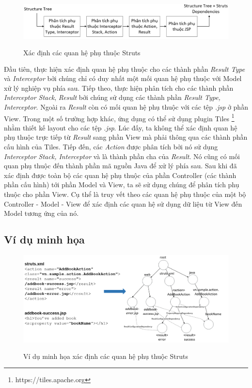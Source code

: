 \documentclass[12pt]{report}
\begin{document}
\begin{figure}[h]
	\centering
	\includegraphics[scale=0.55]{struts-analyzer}
	\label{fig:struts-analyzer}
	\caption{Xác định các quan hệ phụ thuộc Struts}
\end{figure}

Đầu tiên, thực hiện xác định quan hệ phụ thuộc cho các thành phần \textit{Result Type} và \textit{Interceptor} bởi chúng chỉ có duy nhất một mối quan hệ phụ thuộc với Model xử lý nghiệp vụ phía sau. Tiếp theo, thực hiện phân tích cho các thành phần \textit{Interceptor Stack}, \textit{Result} bởi chúng sử dụng các thành phần \textit{Result Type, Interceptor}. Ngoài ra \textit{Result} còn có mối quan hệ phụ thuộc với các tệp \textit{.jsp} ở phần View. Trong một số trường hợp khác, ứng dụng có thể sử dụng plugin Tiles \footnote{https://tiles.apache.org} nhằm thiết kế layout cho các tệp \textit{.jsp}. Lúc đấy, ta không thể xác định quan hệ phụ thuộc trực tiếp từ \textit{Result} sang phần View mà phải thông qua các thành phần cấu hình của Tiles. Tiếp đến, các \textit{Action} được phân tích bởi nó sử dụng \textit{Interceptor Stack, Interceptor} và là thành phần cha của \textit{Result}. Nó cũng có mối quan phụ thuộc đến thành phần mã nguồn Java để xử lý phía sau. Sau khi đã xác định được toàn bộ các quan hệ phụ thuộc của phần Controller (các thành phần cấu hình) tới phần Model và View, ta sẽ sử dụng chúng để phân tích phụ thuộc cho phần View. Cụ thể là truy vết theo các quan hệ phụ thuộc của một bộ Controller - Model - View để xác định các quan hệ sử dụng dữ liệu từ View đến Model tương ứng của nó.

\subsection{Ví dụ minh họa}

\begin{figure}[h]
	\centering
	\includegraphics[scale=0.53]{struts-analyzer-sample}
	\label{fig:struts-analyzer-sample}
	\caption{Ví dụ minh họa xác định các quan hệ phụ thuộc Struts}
\end{figure}
\end{document}
